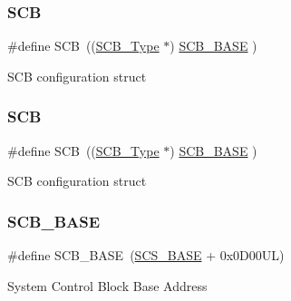 \subsubsection{\texorpdfstring{SCB}{SCB}\hspace{0.1cm}{\footnotesize\ttfamily [11/12]}}
{\footnotesize\ttfamily \#define S\+CB~((\mbox{\hyperlink{struct_s_c_b___type}{S\+C\+B\+\_\+\+Type}}       $\ast$)     \mbox{\hyperlink{group___c_m_s_i_s__core__base_gad55a7ddb8d4b2398b0c1cfec76c0d9fd}{S\+C\+B\+\_\+\+B\+A\+SE}}         )}

S\+CB configuration struct \mbox{\label{group___c_m_s_i_s__core__base_gaaaf6477c2bde2f00f99e3c2fd1060b01}} 
\subsubsection{\texorpdfstring{SCB}{SCB}\hspace{0.1cm}{\footnotesize\ttfamily [12/12]}}
{\footnotesize\ttfamily \#define S\+CB~((\mbox{\hyperlink{struct_s_c_b___type}{S\+C\+B\+\_\+\+Type}}       $\ast$)     \mbox{\hyperlink{group___c_m_s_i_s__core__base_gad55a7ddb8d4b2398b0c1cfec76c0d9fd}{S\+C\+B\+\_\+\+B\+A\+SE}}         )}

S\+CB configuration struct \mbox{\label{group___c_m_s_i_s__core__base_gad55a7ddb8d4b2398b0c1cfec76c0d9fd}} 
\subsubsection{\texorpdfstring{SCB\_BASE}{SCB\_BASE}\hspace{0.1cm}{\footnotesize\ttfamily [1/12]}}
{\footnotesize\ttfamily \#define S\+C\+B\+\_\+\+B\+A\+SE~(\mbox{\hyperlink{group___c_m_s_i_s__core__base_ga3c14ed93192c8d9143322bbf77ebf770}{S\+C\+S\+\_\+\+B\+A\+SE}} +  0x0\+D00\+U\+L)}

System Control Block Base Address \mbox{\label{group___c_m_s_i_s__core__base_gad55a7ddb8d4b2398b0c1cfec76c0d9fd}} 
